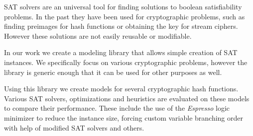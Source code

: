 SAT solvers are an universal tool for finding solutions to boolean satisfiability problems.
In the past they have been used for cryptographic problems, such as finding preimages for hash functions or obtaining the key for stream ciphers.
However these solutions are not easily reusable or modifiable.

In our work we create a modeling library that allows simple creation of SAT instances.
We specifically focus on various cryptographic problems, however the library is generic enough that it can be used for other purposes as well.

Using this library we create models for several cryptographic hash functions.
Various SAT solvers, optimizations and heuristics are evaluated on these models to compare their performance.
These include the use of the \emph{Espresso} logic minimizer to reduce the instance size, forcing custom variable branching order with help of modified SAT solvers and others.

